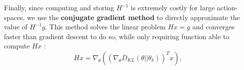 \documentclass[10pt,landscape]{article}
\begin{document}
\begin{multicols}{3}
Finally, since computing and storing $H^{-1}$ is extremely costly for large action-spaces, we use the \textbf{conjugate gradient method} to directly approximate the value of $H^{-1}g$. This method solves the linear problem $Hx = g$ and converges faster than gradient descent to do so, while only requiring function able to compute $Hx$ :
$$ Hx = \nabla_{\theta} \left( \left(\nabla_{\theta} \overline{D}_{KL}(\theta || \theta_k)\right)^T x \right), $$


\end{multicols}
\end{document}
